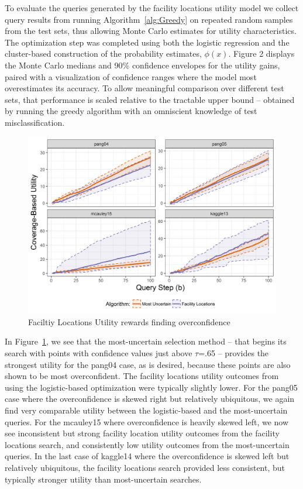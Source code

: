 \documentclass[letterpaper]{article} %
\newcommand{\km}[1]{{\color{red} #1}} %
\begin{document}
To evaluate the queries generated by the facility locations utility model we collect query results from running Algorithm~\ref{alg:Greedy} on repeated random samples from the test sets, thus allowing Monte Carlo estimates for utility characteristics. The optimization step was completed using both the logistic regression and the cluster-based construction of the probability estimates, $\phi(x)$. Figure 2 displays the Monte Carlo medians and 90\% confidence envelopes for the utility gains, paired with a visualization of confidence ranges where the model most overestimates its accuracy. To allow meaningful comparison over different test sets, that performance is scaled relative to the tractable upper bound – obtained by running the greedy algorithm with an omniscient knowledge of test misclassification. 

\begin{figure}[t]
 \centering
  \includegraphics[width=\textwidth]{../experimentsAndPlots/flUtilPlaceholder.png}
  \caption{Faciltiy Locations Utility rewards finding overconfidence}
  \label{fig:flutil}
\end{figure}

In Figure~\ref{fig:flutil}, we see that the most-uncertain selection method – that begins its search with points with confidence values just above $\tau$=.65 – provides the strongest utility for the pang04 case, as is desired, because these points are also shown to be most overconfident. The facility locations utility outcomes from using the logistic-based optimization were typically slightly lower. For the pang05 case where the overconfidence is skewed right but relatively ubiquitous, we again find very comparable utility between the logistic-based and the most-uncertain queries. For the mcauley15 where overconfidence is heavily skewed left, we now see inconsistent but strong facility location utility outcomes from the facility locations search, and consistently low utility outcomes from the most-uncertain queries. \km{In the last case of kaggle14 where the overconfidence is skewed left but relatively ubiquitous, the facility locations search provided less consistent, but typically stronger utility than most-uncertain searches}. 
\end{document}

